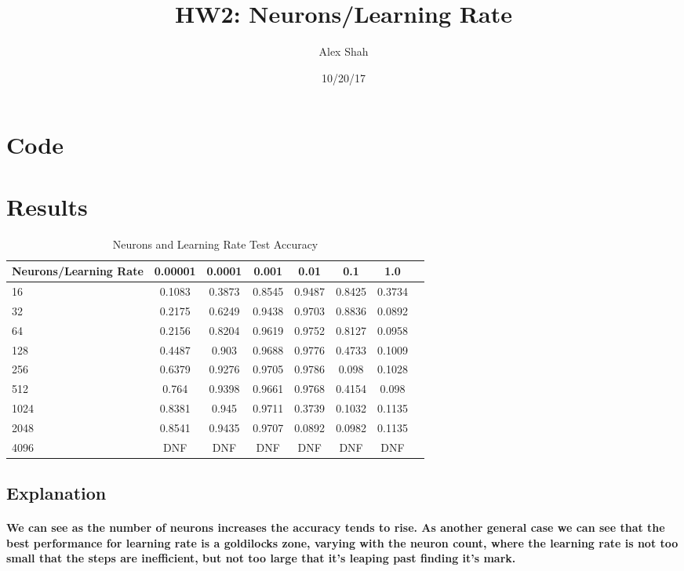\documentclass[10pt,a4paper]{report}
\title{HW2: Neurons/Learning Rate}
\author{Alex Shah}
\date{10/20/17}
\begin{document}
\lstset{language=Python}
\maketitle

\section{Code}



\clearpage

\section{Results}

\begin{table}[h]
 \caption{Neurons and Learning Rate Test Accuracy}
 \label{tbl:aTable}
 \begin{center}
  \begin{tabular}{lccccccr}
    \hline 
    Neurons/Learning Rate & 0.00001 & 0.0001 & 0.001 & 0.01 & 0.1 & 1.0  \\
    \hline
    16 & 0.1083 & 0.3873 & 0.8545 & 0.9487 & 0.8425 & 0.3734 \\
    32 & 0.2175 & 0.6249 & 0.9438 & 0.9703 & 0.8836 & 0.0892 \\
    64 & 0.2156 & 0.8204 & 0.9619 & 0.9752 & 0.8127 & 0.0958 \\
    128 & 0.4487 & 0.903 & 0.9688 & 0.9776 & 0.4733 & 0.1009 \\
    256 & 0.6379 & 0.9276 & 0.9705 & 0.9786 & 0.098 & 0.1028 \\
    512 & 0.764 & 0.9398 & 0.9661 & 0.9768 & 0.4154 & 0.098 \\
    1024 & 0.8381 & 0.945 & 0.9711 & 0.3739 & 0.1032 & 0.1135 \\
    2048 & 0.8541 & 0.9435 & 0.9707 & 0.0892 & 0.0982 & 0.1135 \\
    4096 & DNF & DNF & DNF & DNF & DNF & DNF \\
    \hline 
  \end{tabular}
 \end{center}
\end{table}

\subsection{Explanation}

\paragraph{
We can see as the number of neurons increases the accuracy tends to rise. As another general case we can see that the best performance for learning rate is a goldilocks zone, varying with the neuron count, where the learning rate is not too small that the steps are inefficient, but not too large that it's leaping past finding it's mark. 
}
\end{document}
